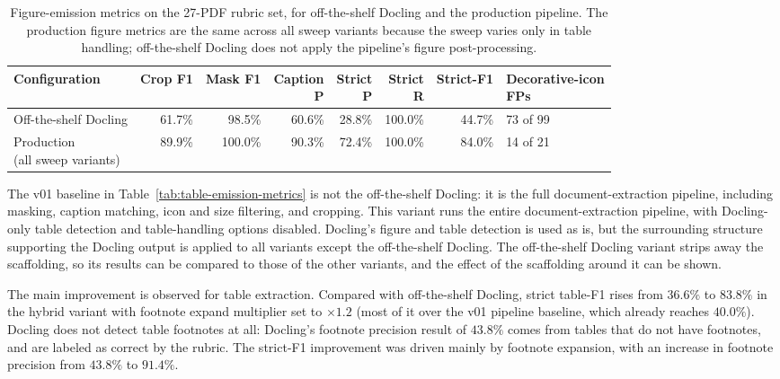 \begin{table}[htpb]
    \caption[Figure-emission metrics]{Figure-emission metrics on the 27-PDF rubric set, for off-the-shelf Docling and the production pipeline. The production figure metrics are the same across all sweep variants because the sweep varies only in table handling; off-the-shelf Docling does not apply the pipeline's figure post-processing.}
    \label{tab:figure-emission-metrics}
    \centering
    \small
    \begin{tabular}{@{}l r r r r r r l@{}}
    \toprule
          Configuration & Crop F1 & Mask F1 &
          \makecell[r]{Caption\\P} & \makecell[r]{Strict\\P} &
          \makecell[r]{Strict\\R} & Strict-F1 &
          \makecell[l]{Decorative-icon\\FPs} \\
          \midrule
          Off-the-shelf Docling & 61.7\% & 98.5\% & 60.6\% & 28.8\%
  & 100.0\% & 44.7\% & 73 of 99 \\
          \makecell[l]{Production\\(all sweep variants)} & 89.9\% &
  100.0\% & 90.3\% & 72.4\% & 100.0\% & 84.0\% & 14 of 21 \\
          \bottomrule
      \end{tabular}
\end{table}

The v01 baseline in Table~\ref{tab:table-emission-metrics} is not the off-the-shelf Docling: it is the full document-extraction pipeline, including masking, caption matching, icon and size filtering, and cropping. This variant runs the entire document-extraction pipeline, with Docling-only table detection and table-handling options disabled. Docling's figure and table detection is used as is, but the surrounding structure supporting the Docling output is applied to all variants except the off-the-shelf Docling. The off-the-shelf Docling variant strips away the scaffolding, so its results can be compared to those of the other variants, and the effect of the scaffolding around it can be shown.

The main improvement is observed for table extraction. Compared with off-the-shelf Docling, strict table-F1 rises from $36.6\%$ to $83.8\%$ in the hybrid variant with footnote expand multiplier set to $\times1.2$ (most of it over the v01 pipeline baseline, which already reaches $40.0\%$). Docling does not detect table footnotes at all: Docling's footnote precision result of $43.8\%$ comes from tables that do not have footnotes, and are labeled as correct by the rubric. The strict-F1 improvement was driven mainly by footnote expansion, with an increase in footnote precision from $43.8\%$ to $91.4\%$.

